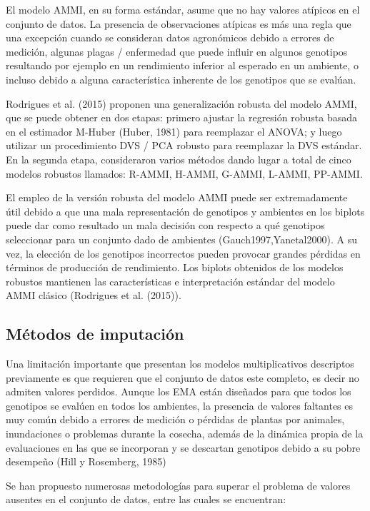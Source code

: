 El modelo AMMI, en su forma estándar, asume que no hay valores atípicos en el conjunto de datos. La presencia de observaciones atípicas es más una regla que una excepción cuando se consideran datos agronómicos debido a errores de medición, algunas plagas / enfermedad que puede influir en algunos genotipos  resultando por ejemplo en un rendimiento inferior al esperado en un ambiente, o incluso debido a alguna característica inherente de los genotipos que se evalúan.

Rodrigues et al. (2015) proponen una generalización robusta del modelo AMMI, que se puede obtener en dos etapas: primero ajustar la regresión robusta basada en el estimador M-Huber (Huber, 1981) para reemplazar el ANOVA; y luego utilizar un procedimiento DVS / PCA robusto para reemplazar la DVS estándar. En la segunda etapa, consideraron varios métodos dando lugar a total de cinco modelos robustos llamados: R-AMMI, H-AMMI, G-AMMI, L-AMMI, PP-AMMI. 

El empleo de la versión robusta del modelo AMMI puede ser extremadamente útil debido a que una mala representación de genotipos y ambientes en los biplots puede dar como resultado un mala decisión con respecto a qué genotipos seleccionar para un conjunto dado de ambientes (Gauch1997,Yanetal2000). A su vez, la elección de los genotipos incorrectos pueden provocar grandes pérdidas en términos de producción de rendimiento. Los biplots obtenidos de los modelos robustos mantienen las características e interpretación estándar del modelo AMMI clásico (Rodrigues et al. (2015)).


\subsection{Métodos de imputación}


Una limitación importante que presentan los modelos multiplicativos descriptos previamente es que requieren que el conjunto de datos este completo, es decir no admiten valores perdidos. Aunque los EMA están diseñados para que todos los genotipos se evalúen en todos los ambientes, la presencia de valores faltantes es muy común debido a errores de medición o pérdidas de plantas por animales, inundaciones o problemas durante la cosecha, además de la dinámica propia de la evaluaciones en las que se incorporan y se descartan genotipos debido a su pobre desempeño (Hill y Rosemberg, 1985)

Se han propuesto numerosas metodologías para superar el problema de valores ausentes en el conjunto de datos, entre las cuales se encuentran:

